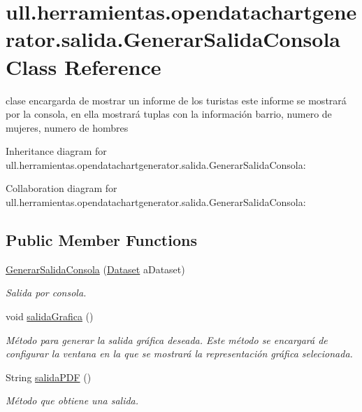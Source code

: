 \hypertarget{classull_1_1herramientas_1_1opendatachartgenerator_1_1salida_1_1_generar_salida_consola}{}\section{ull.\+herramientas.\+opendatachartgenerator.\+salida.\+Generar\+Salida\+Consola Class Reference}
\label{classull_1_1herramientas_1_1opendatachartgenerator_1_1salida_1_1_generar_salida_consola}


clase encargarda de mostrar un informe de los turistas este informe se mostrará por la consola, en ella mostrará tuplas con la información barrio, numero de mujeres, numero de hombres  




Inheritance diagram for ull.\+herramientas.\+opendatachartgenerator.\+salida.\+Generar\+Salida\+Consola\+:


Collaboration diagram for ull.\+herramientas.\+opendatachartgenerator.\+salida.\+Generar\+Salida\+Consola\+:
\subsection*{Public Member Functions}
\begin{DoxyCompactItemize}
\item 
\mbox{\hyperlink{classull_1_1herramientas_1_1opendatachartgenerator_1_1salida_1_1_generar_salida_consola_aa3947da04a8fa1cd2ad6e2713a370b86}{Generar\+Salida\+Consola}} (\mbox{\hyperlink{classull_1_1herramientas_1_1opendatachartgenerator_1_1_dataset}{Dataset}} a\+Dataset)
\begin{DoxyCompactList}\small\item\em Salida por consola. \end{DoxyCompactList}\item 
\mbox{\label{classull_1_1herramientas_1_1opendatachartgenerator_1_1salida_1_1_generar_salida_consola_ab937447cb06bf39bb1a529b129f6c711}} 
void \mbox{\hyperlink{classull_1_1herramientas_1_1opendatachartgenerator_1_1salida_1_1_generar_salida_consola_ab937447cb06bf39bb1a529b129f6c711}{salida\+Grafica}} ()
\begin{DoxyCompactList}\small\item\em Método para generar la salida gráfica deseada. Este método se encargará de configurar la ventana en la que se mostrará la representación gráfica selecionada. \end{DoxyCompactList}\item 
String \mbox{\hyperlink{classull_1_1herramientas_1_1opendatachartgenerator_1_1salida_1_1_generar_salida_consola_a77ed2e5c73405f6fc732597ff06e421c}{salida\+P\+DF}} ()
\begin{DoxyCompactList}\small\item\em Método que obtiene una salida. \end{DoxyCompactList}\end{DoxyCompactItemize}


